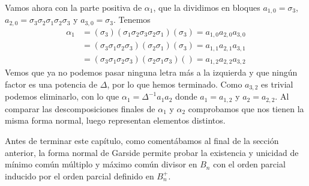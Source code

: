 \documentclass[TFG.tex]{subfiles}
\begin{document}
\begin{ej}


Vamos ahora con la parte positiva de $\alpha_1$, que la dividimos en bloques $a_{1,0}=\sigma_3$, $a_{2,0}=\sigma_3\sigma_2\sigma_1\sigma_2\sigma_3$ y $a_{3,0}=\sigma_3$. Tenemos 
\begin{align*}
\alpha_1&=(\sigma_3)(\sigma_1\sigma_2\sigma_3\sigma_2\sigma_1)(\sigma_3)=a_{1,0}a_{2,0}a_{3,0} \\
&=(\sigma_3\sigma_1\sigma_2\sigma_3)(\sigma_2\sigma_1)(\sigma_3)=a_{1,1}a_{2,1}a_{3,1}\\
&=(\sigma_3\sigma_1\sigma_2\sigma_3)(\sigma_2\sigma_1\sigma_3)()= a_{1,2}a_{2,2}a_{3,2}
\end{align*}
Vemos que ya no podemos pasar ninguna letra más a la izquierda y que ningún factor es una potencia de $\Delta$, por lo que hemos terminado. Como $a_{3,2}$ es trivial podemos eliminarlo, con lo que $\alpha_1=\Delta^{-1}a_1a_2$ donde $a_1=a_{1,2}$ y $a_2=a_{2,2}$. Al comparar las descomposiciones finales de $\alpha_1$ y $\alpha_2$ comprobamos que nos tienen la misma forma normal, luego representan elementos distintos.
\end{ej}

Antes de terminar este capítulo, como comentábamos al final de la sección anterior, la forma normal de Garside permite probar la existencia y unicidad de mínimo común múltiplo y máximo común divisor en $B_n$ con el orden parcial inducido por el orden parcial definido en $B_n^+$.  
\end{document}
